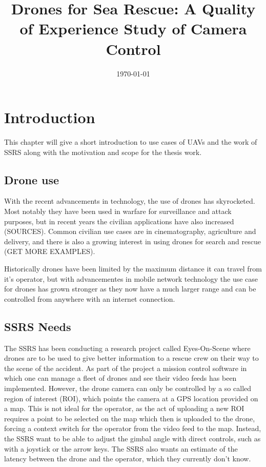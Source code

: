 \documentclass[nofilelist]{cslthse-msc}
\title{Drones for Sea Rescue: A Quality of Experience Study of Camera Control}
\date{\today}
\begin{document}
\renewcommand{\bibname}{References}

\makefrontmatter
\chapter{Introduction}
This chapter will give a short introduction to use cases of UAVs and the work of SSRS along with the motivation and scope for the thesis work.

\section{Drone use}
With the recent advancements in technology, the use of drones has skyrocketed. Most notably they have been used in warfare for surveillance and attack purposes, but in recent years the civilian applications have also increased (SOURCES). Common civilian use cases are in cinematography, agriculture and delivery, and there is also a growing interest in using drones for search and rescue (GET MORE EXAMPLES). 

Historically drones have been limited by the maximum distance it can travel from it's operator, but with advancementes in mobile network technology the use case for drones has grown stronger as they now have a much larger range and can be controlled from anywhere with an internet connection.   

\section{SSRS Needs}
The SSRS has been conducting a research project called Eyes-On-Scene where drones are to be used to give better information to a rescue crew on their way to the scene of the accident. As part of the project a mission control software in which one can manage a fleet of drones and see their video feeds has been implemented. However, the drone camera can only be controlled by a so called region of interest (ROI), which points the camera at a GPS location provided on a map. This is not ideal for the operator, as the act of uploading a new ROI requires a point to be selected on the map which then is uploaded to the drone, forcing a context switch for the operator from the video feed to the map. Instead, the SSRS want to be able to adjust the gimbal angle with direct controls, such as with a joystick or the arrow keys. The SSRS also wants an estimate of the latency between the drone and the operator, which they currently don't know.
\end{document}
